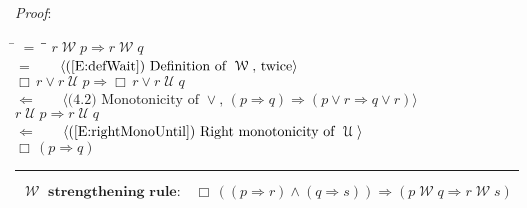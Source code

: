 \documentclass[12pt, fleqn, leqno]{article}
\newcommand{\lgap}{2pt}                             %
\newcommand{\mymathindent}{24pt}                    %
\newcommand{\impl}{\ensuremath{\Rightarrow}}        %
\newcommand{\foll}{\ensuremath{\Leftarrow}}         %
\newcommand{\Until}{\;\mathcal{U}\;}
\newcommand{\Wait}{\;\mathcal{W}\;}
\newcommand{\Always}{\Box\,}
\newcommand{\myqed}{\rule[-.23ex]{1.2ex}{2.0ex}}
\newcommand{\myqedtab}{\hspace{384pt}}              %
\newcommand{\Gll} {\langle}                         %
\newcommand{\Ggg} {\rangle}                         %
\newcommand{\Hint}[1]     {\ \ \ $\Gll              \mbox{#1} \Ggg$ }   %
\begin{document}
\emph{Proof}:
\begin{tabbing}
\hspace{\mymathindent} \= $= \;$ \= \myqedtab \= \kill
  \> \>   $r \Wait p \impl r \Wait q$\\[\lgap]
  \> $=$ \> \Hint{(\ref{E:defWait}) Definition of $\Wait$, twice} \\[\lgap]
  \> \>   $\Always r \lor r \Until p \impl \Always r \lor r \Until q$\\[\lgap]
  \> $\foll$  \>  \Hint{(4.2) Monotonicity of $\lor$, $(p\impl q)\impl (p\lor r \impl q\lor r)$}\\[\lgap]
  \> \>   $r \Until p \impl r \Until q$\\[\lgap]
  \> $\foll$  \>  \Hint{(\ref{E:rightMonoUntil}) Right monotonicity of $\Until$}\\[\lgap]
  \> \>   $\Always (p \impl q)$ \quad \myqed
\end{tabbing}
\begin{equation}\label{E:waitstrength}
\textbf{$\Wait$ strengthening rule:}\quad \Always ((p \impl r) \land (q \impl s)) \impl (p \Wait q \impl r \Wait s)
\end{equation}
\end{document}
